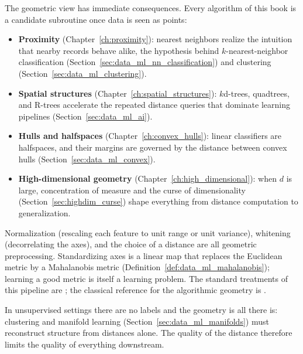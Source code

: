 The geometric view has immediate consequences. Every algorithm of this book
is a candidate subroutine once data is seen as points:
\begin{itemize}
\item \textbf{Proximity} (Chapter~\ref{ch:proximity}): nearest neighbors
  realize the intuition that nearby records behave alike, the hypothesis
  behind $k$-nearest-neighbor classification
  (Section~\ref{sec:data_ml_nn_classification}) and clustering
  (Section~\ref{sec:data_ml_clustering}).
\item \textbf{Spatial structures} (Chapter~\ref{ch:spatial_structures}):
  $k$d-trees, quadtrees, and R-trees accelerate the repeated distance
  queries that dominate learning pipelines (Section~\ref{sec:data_ml_ai}).
\item \textbf{Hulls and halfspaces} (Chapter~\ref{ch:convex_hulls}):
  linear classifiers are halfspaces, and their margins are governed by the
  distance between convex hulls (Section~\ref{sec:data_ml_convex}).
\item \textbf{High-dimensional geometry}
  (Chapter~\ref{ch:high_dimensional}): when $d$ is large, concentration of
  measure and the curse of dimensionality
  (Section~\ref{sec:highdim_curse}) shape everything from distance
  computation to generalization.
\end{itemize}

\begin{remark}
  Normalization (rescaling each feature to unit range or unit variance),
  whitening (decorrelating the axes), and the choice of a distance are all
  geometric preprocessing. Standardizing axes is a linear map that replaces
  the Euclidean metric by a Mahalanobis metric
  (Definition~\ref{def:data_ml_mahalanobis}); learning a good metric is
  itself a learning problem. The standard treatments of this pipeline are
  \cite{bishop2006,duda2001,hastie2009}; the classical reference for the
  algorithmic geometry is \cite{deberg2008,berg2008}.
\end{remark}

\begin{remark}
  In unsupervised settings there are no labels and the geometry is all there
  is: clustering and manifold learning
  (Section~\ref{sec:data_ml_manifolds}) must reconstruct structure from
  distances alone. The quality of the distance therefore limits the quality
  of everything downstream.
\end{remark}

